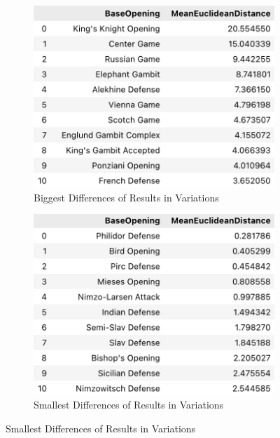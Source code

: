 \documentclass[a4paper, 11pt]{article}
\begin{document}
\begin{figure}[H]
    \centering
    \caption{Top 10 Openings with the Biggest and Smallest Differences of Results in Variations}
    \label{fig:top15BiggestAndSmallestMeanDifferenceOfBaseOpenings}
    \begin{subfigure}{0.49\textwidth}
        \centering
        \caption{Biggest Differences of Results in Variations}
        \label{fig:top15BiggestMeanDifferenceOfBaseOpenings}
        \includegraphics[width=\textwidth]{Top 10 Openings with Biggest Mean Difference in Variations.png}
    \end{subfigure}
    \hfill
    \begin{subfigure}{0.49\textwidth}
        \centering
        \caption{Smallest Differences of Results in Variations}
        \label{fig:top15SmallestMeanDifferenceOfBaseOpenings}
        \includegraphics[width=\textwidth]{Top 10 Openings with Smallest Mean Difference in Variations.png}
    \end{subfigure}
\end{figure}
\end{document}
